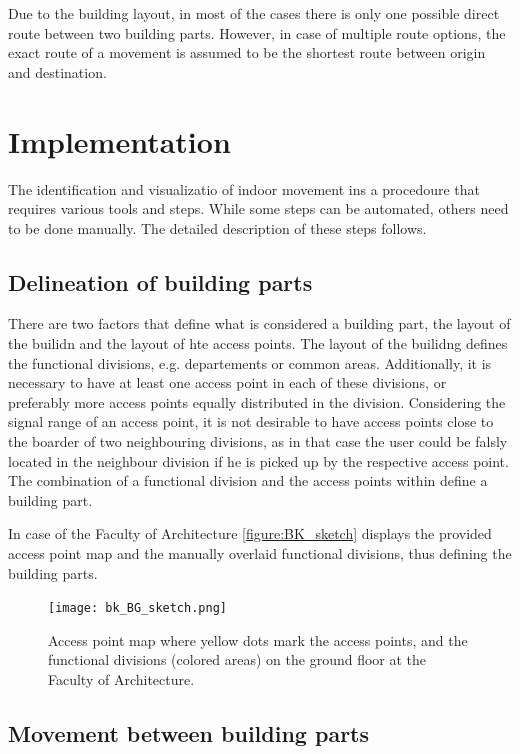 Due to the building layout, in most of the cases there is only one possible
direct route between two building parts. However, in case of multiple route
options, the exact route of a movement is assumed to be the shortest route 
between origin and
destination.

\section{Implementation}
The identification and visualizatio of indoor movement ins a procedoure that
requires various tools and steps. While some steps can be automated, others need
to be done manually. The detailed description of these steps follows.

\subsection{Delineation of building parts}
There are two factors that define what is considered a building part, the layout
of the builidn and the layout of hte access points. The layout of the
builidng defines the functional divisions, e.g. departements or common areas.
Additionally, it is necessary to have at least one access point in each of these
divisions, or preferably more access points equally distributed in the division.
Considering the signal range of an access point, it is not desirable to have
access points close to the boarder of two neighbouring divisions, as in that
case the user could be falsly located in the neighbour division if he is picked
up by the respective access point. The combination of a functional division and
the access points within define a building part.

In case of the Faculty of Architecture \autoref{figure:BK_sketch} displays the
provided access point map and the manually overlaid functional divisions, thus
defining the building parts.

\begin{figure}[H]
\centering
\texttt{[image: bk\_BG\_sketch.png]}
\captionsetup{justification=centering}
\caption{Access point map where yellow dots mark the access points, and
the functional divisions (colored areas) on the ground floor at the Faculty of
Architecture.}
\label{figure:BK_sketch}
\end{figure}

\subsection{Movement between building parts}


